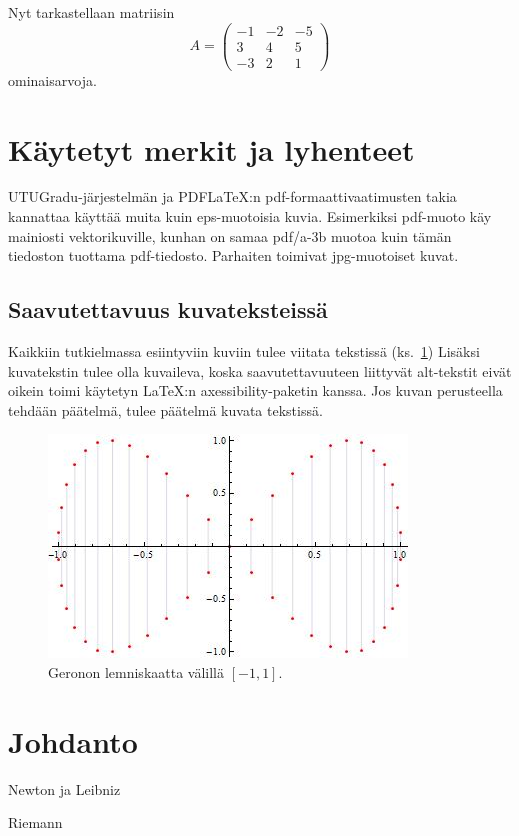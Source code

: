 Nyt tarkastellaan matriisin
\[
A=\left(\begin{array}{rrr} -1 & -2 & -5\\ 3& 4& 5\\ -3 & 2 & 1 \end{array}\right)
\]
ominaisarvoja.

\section{Käytetyt merkit ja lyhenteet}

UTUGradu-järjestelmän ja PDF\LaTeX :n pdf-formaattivaatimusten takia kannattaa käyttää muita kuin eps-muotoisia kuvia. Esimerkiksi pdf-muoto käy mainiosti vektorikuville, kunhan on samaa pdf/a-3b muotoa kuin tämän tiedoston tuottama pdf-tiedosto. Parhaiten toimivat jpg-muotoiset kuvat.



\subsection{Saavutettavuus kuvateksteissä}

Kaikkiin tutkielmassa esiintyviin kuviin tulee viitata tekstissä (ks.~\ref{kuvatus1}) Lisäksi kuvatekstin tulee olla kuvaileva, koska saavutettavuuteen liittyvät alt-tekstit eivät oikein toimi käytetyn \LaTeX :n axessibility-paketin kanssa. Jos kuvan perusteella tehdään päätelmä, tulee päätelmä kuvata tekstissä. 

\begin{figure}[ht]
\begin{center}
\includegraphics[width=.45\textwidth]{siivet.jpg}
\end{center}
\label{kuvatus1}
\caption{Geronon lemniskaatta välillä $[-1,1]$.}
\end{figure}

\section{Johdanto}

\lipsum[1-10]


 
\begin{thebibliography}{99}

 Newton ja Leibniz

 Riemann

\end{thebibliography}

